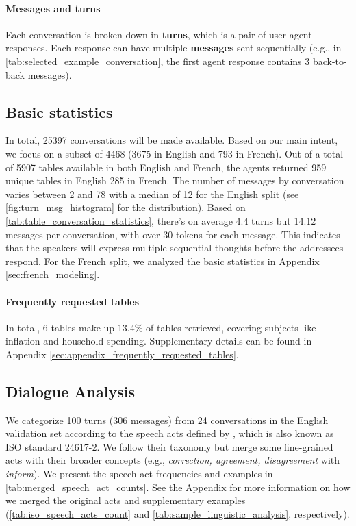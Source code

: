\documentclass[11pt]{article}
\begin{document}
\paragraph{Messages and turns} Each conversation is broken down in \textbf{turns}, which is a pair of user-agent responses. Each response can have multiple \textbf{messages} sent sequentially (e.g., in \autoref{tab:selected_example_conversation}, the first agent response contains 3 back-to-back messages).

\subsection{Basic statistics}\label{sec:basic_statistics}

In total, 25397 conversations will be made available. Based on our main intent, we focus on a subset of 4468 (3675 in English and 793 in French). Out of a total of 5907 tables available in both English and French, the agents returned 959 unique tables in English 285 in French. The number of messages by conversation varies between 2 and 78 with a median of 12 for the English split (see \autoref{fig:turn_msg_histogram} for the distribution). Based on \autoref{tab:table_conversation_statistics}, there's on average 4.4 turns but 14.12 messages per conversation, with over 30 tokens for each message. This indicates that the speakers will express multiple sequential thoughts before the addressees respond. For the French split, we analyzed the basic statistics in Appendix \ref{sec:french_modeling}.

\paragraph{Frequently requested tables} In total, 6 tables make up 13.4\% of tables retrieved, covering subjects like inflation and household spending. Supplementary details can be found in Appendix \ref{sec:appendix_frequently_requested_tables}.





\subsection{Dialogue Analysis}
\label{sec:dialogue_analysis}


We categorize 100 turns (306 messages) from 24 conversations in the English validation set according to the speech acts defined by \citet{bunt_towards_2010, bunt2020iso}, which is also known as ISO standard 24617-2. We follow their taxonomy but merge some fine-grained acts with their broader concepts (e.g., \textit{correction, agreement, disagreement} with \textit{inform}). We present the speech act frequencies and examples in \autoref{tab:merged_speech_act_counts}. See the Appendix for more information on how we merged the original acts and supplementary examples (\autoref{tab:iso_speech_acts_count} and \autoref{tab:sample_linguistic_analysis}, respectively).
\end{document}
